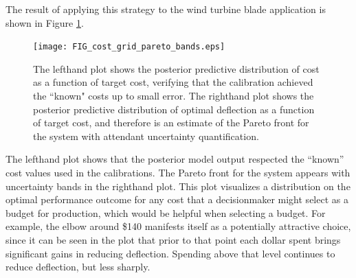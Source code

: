 \documentclass[12pt]{article}
\begin{document}
%
The result of applying this strategy to the wind turbine blade application is shown in Figure \ref{fig:known_cost}. 
%
\begin{figure}
\centering
\texttt{[image: FIG\_cost\_grid\_pareto\_bands.eps]}
\caption{The lefthand plot shows the posterior predictive distribution of cost as a function of target cost, verifying that the calibration achieved the ``known" costs up to small error. The righthand plot shows the posterior predictive distribution of optimal deflection as a function of target cost, and therefore is an estimate of the Pareto front for the system with attendant uncertainty quantification.}
\label{fig:known_cost}
\end{figure}
%
The lefthand plot shows that the posterior model output respected the ``known'' cost values used in the calibrations.
%
The Pareto front for the system appears with uncertainty bands in the righthand plot.
%
This plot visualizes a distribution on the optimal performance outcome for any cost that a decisionmaker might select as a budget for production, which would be helpful when selecting a budget.
%
For example, the elbow around \$140 manifests itself as a potentially attractive choice, since it can be seen in the plot that prior to that point each dollar spent brings significant gains in reducing deflection.
%
Spending above that level continues to reduce deflection, but less sharply.
\end{document}
